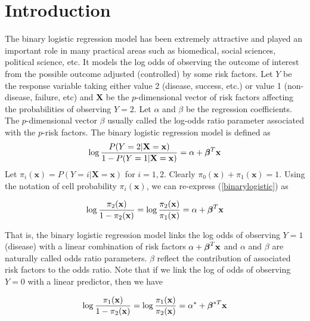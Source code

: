 \documentclass[12]{interact}
\theoremstyle{plain}%
\theoremstyle{definition}
\theoremstyle{remark}
\begin{document}
\section{Introduction}\label{sec:1} 



The binary logistic regression model has been extremely
attractive and played an important role in many practical areas such
as biomedical, social sciences, political science, etc. It models the
log odds of observing the outcome of interest from the possible outcome
adjusted (controlled) by some risk factors. Let $Y$ be the response
variable taking either value 2 (disease, success, etc.) or value 1
(non-disease, failure, etc) and ${\mathbf{X}}$ be the $p$-dimensional vector
of risk factors affecting the probabilities of observing $Y=2$. Let $\alpha$
and {\boldmath $\beta$} be the regression coefficients. The $p$-dimensional vector
{\boldmath $\beta$} usually called the log-odds ratio parameter associated with
the $p$-risk factors. The binary logistic regression model is defined as
\begin{equation}
	\log \frac{P(Y=2|\mathbf{X} = \mathbf{x})}{1-P(Y=1|\mathbf{X} = \mathbf{x})}
	=\alpha + {\mbox{\boldmath $\beta$}}^T\mathbf{x}\label{binarylogistic}
\end{equation}
Let $\pi_i(\mathbf{x})= P(Y=i |\mathbf{X}=\mathbf{x})$ for $i=1,2$. Clearly
$\pi_0(\mathbf{x})+\pi_1(\mathbf{x})=1$. Using the notation of cell probability
$\pi_i(\mathbf{x})$, we can re-express (\ref{binarylogistic}) as

\begin{equation}
	\log \frac{\pi_2(\mathbf{x})}{1-\pi_2(\mathbf{x})}=
	\log \frac{\pi_2(\mathbf{x})}{\pi_1(\mathbf{x})}=\alpha +  {\mbox{\boldmath $\beta$}}^T\mathbf{x}
\end{equation}

That is, the binary logistic regression model links the log odds of observing $Y=1$ (disease) with
a linear combination of risk factors $\alpha +  {\mbox{\boldmath $\beta$}}^T\mathbf{x}$ and $\alpha$ and
{\boldmath $\beta$} are naturally called odds ratio parameters. {\boldmath $\beta$} reflect the contribution
of associated risk factors to the odds ratio. Note that if we link the log of odds of observing $Y=0$ with a linear predictor, then we have

\begin{equation}
	\log \frac{\pi_1(\mathbf{x})}{1-\pi_2(\mathbf{x})}=
	\log \frac{\pi_1(\mathbf{x})}{\pi_2(\mathbf{x})}=\alpha^* +  {\mbox{\boldmath $\beta$}}^{*T}\mathbf{x} \label{binarylogistic02}
\end{equation}
\end{document}
